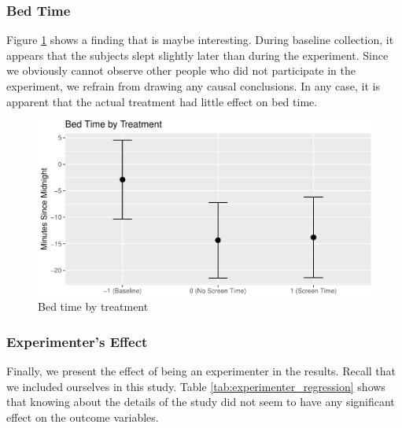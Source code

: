 \documentclass[12pt,]{article}
\begin{document}
\subsubsection{Bed Time}\label{bed-time}

Figure \ref{fig:bed_time_fig} shows a finding that is maybe interesting.
During baseline collection, it appears that the subjects slept slightly
later than during the experiment. Since we obviously cannot observe
other people who did not participate in the experiment, we refrain from
drawing any causal conclusions. In any case, it is apparent that the
actual treatment had little effect on bed time.

\begin{figure}
\centering
\includegraphics{report_files/figure-latex/bed_time_fig-1.pdf}
\caption{\label{fig:bed_time_fig} Bed time by treatment}
\end{figure}

\subsubsection{Experimenter's Effect}\label{experimenters-effect}

Finally, we present the effect of being an experimenter in the results.
Recall that we included ourselves in this study. Table
\ref{tab:experimenter_regression} shows that knowing about the details
of the study did not seem to have any significant effect on the outcome
variables.
\end{document}
